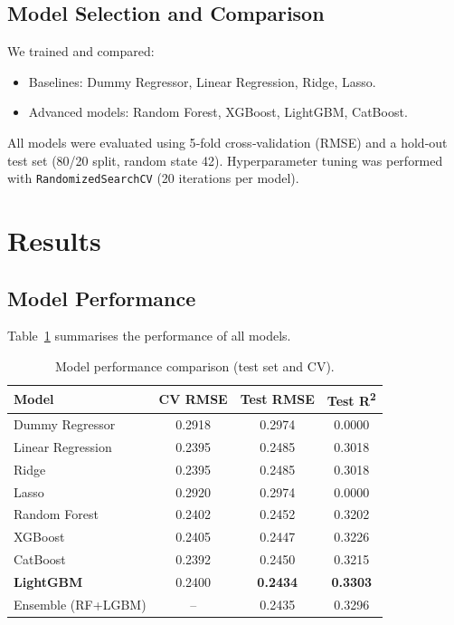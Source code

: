 \documentclass[11pt,a4paper]{article}
\begin{document}
\subsection{Model Selection and Comparison}
We trained and compared:
\begin{itemize}
    \item Baselines: Dummy Regressor, Linear Regression, Ridge, Lasso.
    \item Advanced models: Random Forest, XGBoost, LightGBM, CatBoost.
\end{itemize}
All models were evaluated using 5‑fold cross‑validation (RMSE) and a hold‑out test set (80/20 split, random state 42). Hyperparameter tuning was performed with \texttt{RandomizedSearchCV} (20 iterations per model).

\section{Results}

\subsection{Model Performance}
Table~\ref{tab:model_comparison} summarises the performance of all models.

\begin{table}[H]
\centering
\caption{Model performance comparison (test set and CV).}
\label{tab:model_comparison}
\begin{tabular}{lccc}
\toprule
\textbf{Model} & \textbf{CV RMSE} & \textbf{Test RMSE} & \textbf{Test R\textsuperscript{2}} \\
\midrule
Dummy Regressor   & 0.2918 & 0.2974 & 0.0000 \\
Linear Regression & 0.2395 & 0.2485 & 0.3018 \\
Ridge             & 0.2395 & 0.2485 & 0.3018 \\
Lasso             & 0.2920 & 0.2974 & 0.0000 \\
Random Forest     & 0.2402 & 0.2452 & 0.3202 \\
XGBoost          & 0.2405 & 0.2447 & 0.3226 \\
CatBoost          & 0.2392 & 0.2450 & 0.3215 \\
\textbf{LightGBM}           & 0.2400 & \textbf{0.2434} & \textbf{0.3303} \\
Ensemble (RF+LGBM) & – & 0.2435 & 0.3296 \\
\bottomrule
\end{tabular}
\end{table}
\end{document}
